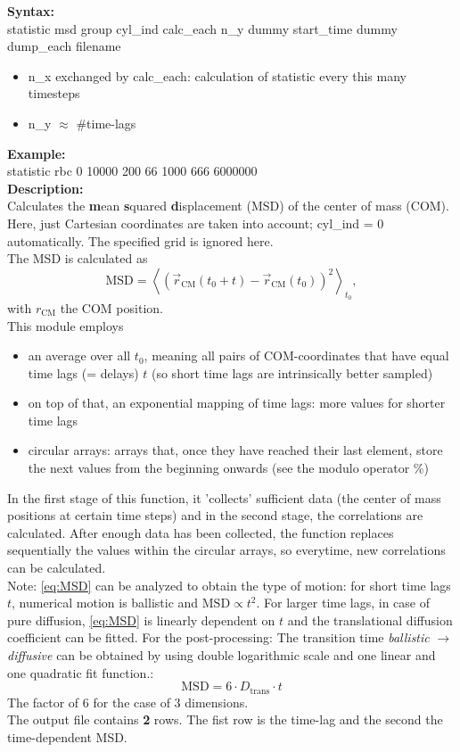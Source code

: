 \textbf{Syntax:}\
\\[0.5ex]
statistic	msd group cyl\_ind calc\_each n\_y dummy start\_time dummy dump\_each filename
\begin{itemize}
\item n\_x exchanged by calc\_each: calculation of statistic every this many timesteps
\item n\_y $\approx$ \#time-lags
\end{itemize} 
\textbf{Example:}
\\[0.5ex]
statistic rbc 0 10000 200 66 1000 666 6000000
\\[2ex]
\textbf{Description:}
\\[0.5ex]
Calculates the \textbf{m}ean \textbf{s}quared \textbf{d}isplacement (MSD) of the center of mass (COM).
\\[2ex]
Here, just Cartesian coordinates are taken into account; cyl\_ind = 0 automatically.
The specified grid is ignored here.\\
The MSD is calculated as
%
\begin{equation}
\mathrm{MSD} = \left \langle \left ( \vec{r}_\mathrm{CM}(t_0 + t) - \vec{r}_\mathrm{CM}(t_0) \right ) ^2 \right \rangle _{t_0},
\label{eq:MSD}
\end{equation}
%
with $r_\mathrm{CM}$ the COM position.
\\[2ex]
This module employs
%
\begin{itemize}
\item an average over all $t_0$, meaning all pairs of COM-coordinates that have equal time lags (= delays) $t$ (so short time lags are intrinsically better sampled)
\item on top of that, an exponential mapping of time lags: more values for shorter time lags
\item circular arrays: arrays that, once they have reached their last element, store the next values from the beginning onwards (see the modulo operator \%)
\end{itemize}
%
In the first stage of this function, it 'collects' sufficient data (the center of mass positions at certain time steps) and in the second stage, the correlations are calculated. After enough data has been collected, the function replaces sequentially the values within the circular arrays, so everytime, new correlations can be calculated.
\\[2ex]
Note: \cref{eq:MSD} can be analyzed to obtain the type of motion: for short time lags $t$, numerical motion is ballistic and $\mathrm{MSD} \propto t^2$.
For larger time lags, in case of pure diffusion, \cref{eq:MSD} is linearly dependent on $t$ and the translational diffusion coefficient can be fitted.
For the post-processing: The transition time \textit{ballistic} $\longrightarrow$ \textit{diffusive} can be obtained by using double logarithmic scale and one linear and one quadratic fit function.:
%
\begin{equation}
\mathrm{MSD} = 6 \cdot D_{\mathrm{trans}} \cdot t
\label{MSD_diffusion}
\end{equation}
%
The factor of 6 for the case of 3 dimensions.
\\[2ex]
The output file contains {\bfseries 2} rows.
The fist row is the time-lag and the second the time-dependent MSD.

